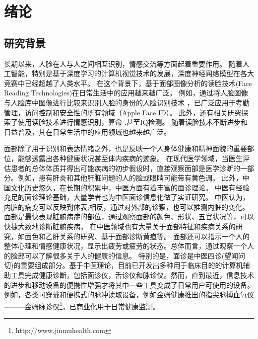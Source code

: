 \chapter{绪论}

\section{研究背景}

长期以来，人脸在人与人之间相互识别，情感交流等方面起着重要作用。
随着人工智能，特别是基于深度学习的计算机视觉技术的发展，深度神经网络模型在各大竞赛中已经超越了人类水平。
在这个背景下，基于面部图像分析的读脸技术(Face Reading Technologies)在日常生活中的应用越来越广泛。
例如，通过将人脸图像与人脸库中图像进行比较来识别人脸的身份的人脸识别技术 \cite{Zhang2016Joint}\cite{Schroff2015FaceNet}，已广泛应用于考勤管理，访问控制和安全性的所有领域（Apple Face ID）。
此外，还有相关研究探索了使用读脸技术进行情感识别\cite{corneanu2016survey}，算命 \cite{Li2007Online}\cite{Tempark2012Chinese},甚至IQ检测\cite{Kleisner2014Perceived}。
随着读脸技术不断进步和日益普及，其在日常生活中的应用领域也越来越广泛。

面部除了用于识别和表达情绪之外，也是反映一个人身体健康和精神面貌的重要部位，能够透露出各种健康状况甚至体内疾病的迹象。
在现代医学领域，当医生评估患者的总体体质并得出可能疾病的初步假设时，直接观察面部是医学诊断的一部分\cite{Clifford2006Shortliffe}。例如，患有肝炎和其他肝脏问题的人的脸或眼睛可能带有黄色调\cite{Li2008Therapeutic}。
此外，中国文化历史悠久，在长期的积累中，中医方面有着丰富的面诊理论。
中医有经验充足的面诊理论基础，大量学者也为中医面诊信息化做了实证研究。
中医认为，内脏的病变可以反映到体表;相反，通过对外部的诊察，也可以推测内脏的变化。面部是最快表现脏腑病症的部位，通过观察面部的颜色、形状、五官状况等，可以快捷大致地诊断脏腑疾病。
在中医领域也有大量关于面部特征和疾病关系的研究，如面色和乙肝关系的研究\cite{杨宏志2007慢性乙型肝炎肝硬化中医面部五色诊断与临床病理的相关性研究}、基于面部诊断黄疸\cite{艾英1998黄疸病人面部色泽定量实验研究}等。
面部还可以指示一个人的整体心理和情感健康状况，显示出疲劳或疲劳的状态。总体而言，通过观察一个人的脸部可以了解很多关于人的健康的信息。
特别的是，面诊是中医四诊(望闻问切)的重要组成部分。基于中医理论，目前已开发出多种用于临床目的的计算机辅助工具完成健康诊断，包括面诊仪\cite{Liu2014Computerized}，舌诊仪\cite{Wang2004An}和脉诊仪\cite{Shu2007Developing}。然而，直到最近，信息技术的进步和移动设备的便携性增强才将其中一些工具变成了日常用户可使用的设备。例如，各类可穿戴和便携式的脉冲读取设备，例如金姆健康推出的指尖脉搏血氧仪———金姆脉诊仪\footnote{http://www.jinmuhealth.com}，已商业化用于日常健康监测。

